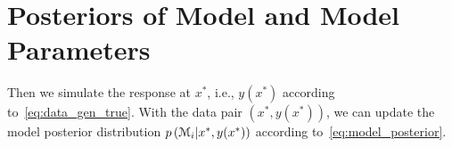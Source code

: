 \documentclass[11pt]{article}
\numberwithin{equation}{section}
\begin{document}
%
%
%   
%



\section{Posteriors of Model and Model Parameters}
Then we simulate the response at $x^*$, i.e., $y(x^*)$ according to~\eqref{eq:data_gen_true}. With the data pair $(x^*,y(x^*))$, we can update the model posterior distribution $p\left(\mathcal{M}_i|x^*,y(x^*)\right)$ according to~\eqref{eq:model_posterior}. 
\end{document}
